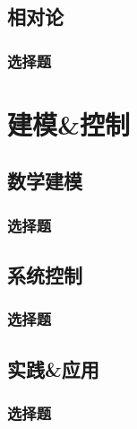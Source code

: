 \documentclass[a4paper,zihao=5,openany,oneside,sub4section]{ctexbook}
\begin{document}
	\chapter{相对论}
		\section{选择题}
\part{建模\&控制}
	\chapter{数学建模}
		\section{选择题}
	\chapter{系统控制}
		\section{选择题}
	\chapter{实践\&应用}
		\section{选择题}

\backmatter
\printindex %


\end{document}
